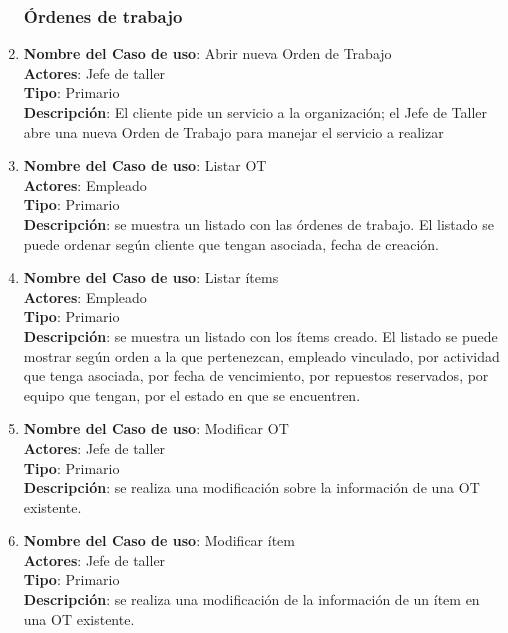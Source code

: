 \documentclass[12pt]{extarticle}
\begin{document}
\begin{spacing}{1.2}
\begin{enumerate}
        \subsubsection{Órdenes de trabajo}



        \item 	\textbf{Nombre del Caso de uso}: Abrir nueva Orden de Trabajo\\
                \textbf{Actores}: Jefe de taller\\
                \textbf{Tipo}: Primario\\
                \textbf{Descripción}: El cliente pide un servicio a la organización; el Jefe de Taller abre una nueva Orden de Trabajo para manejar el servicio a realizar

        \item 	\textbf{Nombre del Caso de uso}: Listar OT\\
                \textbf{Actores}: Empleado\\
                \textbf{Tipo}: Primario\\
                \textbf{Descripción}: se muestra un listado con las órdenes de trabajo. El listado se puede ordenar según cliente que tengan asociada, fecha de creación.

        \item 	\textbf{Nombre del Caso de uso}: Listar ítems\\
                \textbf{Actores}: Empleado\\
                \textbf{Tipo}: Primario\\
                \textbf{Descripción}: se muestra un listado con los ítems creado. El listado se puede mostrar según orden a la que pertenezcan, empleado vinculado, por actividad que tenga asociada, por fecha de vencimiento, por repuestos reservados, por equipo que tengan, por el estado en que se encuentren.

        \item 	\textbf{Nombre del Caso de uso}: Modificar OT\\
                \textbf{Actores}: Jefe de taller\\
                \textbf{Tipo}: Primario\\
                \textbf{Descripción}: se realiza una modificación sobre la información de una OT existente.

        \item 	\textbf{Nombre del Caso de uso}: Modificar ítem\\
                \textbf{Actores}: Jefe de taller\\
                \textbf{Tipo}: Primario\\
                \textbf{Descripción}: se realiza una modificación de la información de un ítem en una OT existente. 


\end{enumerate}
\end{spacing}
\end{document}
